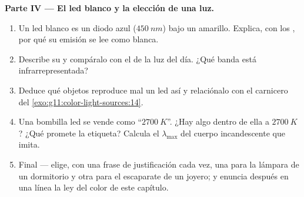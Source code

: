 \begin{problem}
\medskip
\noindent\textbf{Parte IV --- El led blanco y la elección de una luz.}
\begin{enumerate}[resume]
  \item Un led blanco es un diodo azul ($\qty{450}{nm}$) bajo un 
        amarillo. Explica, con los , por qué su
        emisión se lee como blanca.
  \item Describe su  y compáralo con el  de la
        luz del día. ¿Qué banda está infrarrepresentada?
  \item Deduce qué objetos reproduce mal un led así y relaciónalo con el
        carnicero del \cref{exo:g11:color-light-sources:14}.
  \item Una bombilla led se vende como ``$\qty{2700}{K}$''. ¿Hay algo
        dentro de ella a $\qty{2700}{K}$? ¿Qué promete la etiqueta?
        Calcula el $\lambda_{\max}$ del cuerpo incandescente que imita.
  \item Final --- elige, con una frase de justificación cada vez, una
         para la lámpara de un dormitorio y otra
        para el escaparate de un joyero; y enuncia después en una línea
        la ley del color de este capítulo.
\end{enumerate}
\end{problem}
